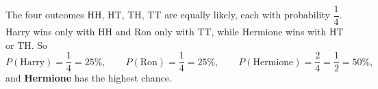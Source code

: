 The four outcomes HH, HT, TH, TT are equally likely, each with probability $\dfrac{1}{4}$. Harry wins only with HH and Ron only with TT, while Hermione wins with HT or TH. So
\[P(\text{Harry})=\dfrac{1}{4}=25\%,\qquad P(\text{Ron})=\dfrac{1}{4}=25\%,\qquad P(\text{Hermione})=\dfrac{2}{4}=\dfrac{1}{2}=50\%,\]
and \textbf{Hermione} has the highest chance.
